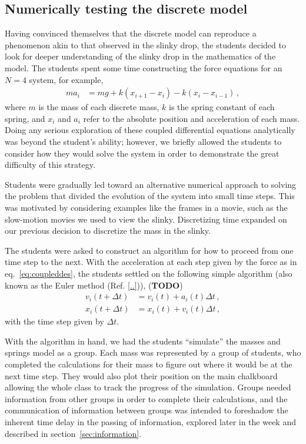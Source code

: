 \documentclass[prb,preprint,superscriptaddress]{revtex4-1}
\newcommand{\TODO}[1]{\marginpar{\raggedright\scriptsize\textbf{TODO:} #1} (\textbf{TODO})}
\newcommand{\eq}[1]{eq.~\eqref{eq:#1}}
\renewcommand{\sec}[1]{section~\ref{sec:#1}}
\newcommand{\nn}{\nonumber}
\begin{document}
\subsection{Numerically testing the discrete model}
\label{subsec:forcesnumeric}

Having convinced themselves that the discrete model can reproduce a phenomenon akin to that observed in the slinky drop,
the students decided to look for deeper understanding of the slinky drop in the mathematics of the model.  The students spent some time constructing the
force equations for an $N=4$ system, for example,
\begin{align} \label{eq:coupleddes}
ma_i &= mg + k(x_{i+1} - x_i) - k(x_i - x_{i-1})
\,,\end{align}
where $m$ is the mass of each discrete mass, $k$ is the spring constant of each
spring, and $x_i$ and $a_i$ refer to the absolute position and acceleration of each mass. Doing any serious exploration of these coupled differential equations
analytically was beyond the student's ability; however, we briefly allowed
the students to consider how they would solve the system in order to demonstrate
the great difficulty of this strategy.

Students were gradually led toward an alternative numerical approach to solving
the problem that divided the evolution of the system into small time
steps. This was motivated by considering examples like the frames in a
movie, such as the slow-motion movies we used to view the slinky. Discretizing time expanded on our previous decision to discretize the mass
in the slinky.

The students were asked to construct an algorithm
for how to proceed from one time step to the next. With the acceleration at each
step given by the force as in \eq{coupleddes}, the students settled on the
following simple algorithm (also known as the Euler method (Ref. \ref{..})),
\TODO{find textbook reference for Euler method}
\begin{align} \label{eq:algorithm}
v_i(t+\Delta t) &= v_i(t) + a_i(t)\Delta t
\,,\nn\\
x_i(t+\Delta t) &= x_i(t) + v_i(t)\Delta t
\,,\end{align}
with the time step given by $\Delta t$.

With the algorithm in hand, we had the students ``simulate'' the masses and
springs model as a group. Each mass was represented by a group of 
students, who completed the calculations for their mass to figure out where it would be
at the next time step.
They would also plot their position on the main chalkboard allowing the whole class to track
the progress of the simulation.
Groups needed information from other groups in order to complete their calculations,
and the communication of information between groups was intended 
to foreshadow the inherent time delay in the passing of information, explored later in
the week and described in \sec{information}.
\end{document}
